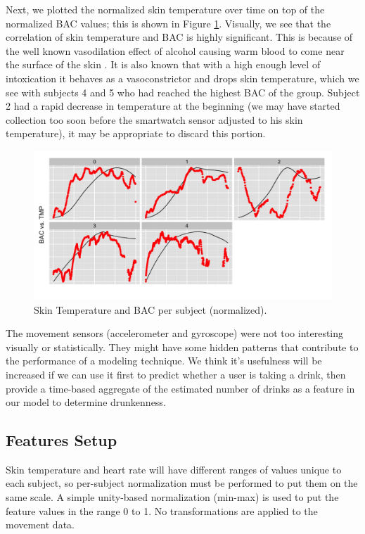 Next, we plotted the normalized skin temperature over time on top of the normalized BAC values; this is shown in Figure \ref{fig:skin_temperatures}. Visually, we see that the correlation of skin temperature and BAC is highly significant. This is because of the well known vasodilation effect of alcohol causing warm blood to come near the surface of the skin \cite{Dekker:1999}. It is also known that with a high enough level of intoxication it behaves as a vasoconstrictor and drops skin temperature, which we see with subjects 4 and 5 who had reached the highest BAC of the group. Subject 2 had a rapid decrease in temperature at the beginning (we may have started collection too soon before the smartwatch sensor adjusted to his skin temperature), it may be appropriate to discard this portion.

\begin{figure}
	\includegraphics[width=1.0\textwidth]{../figs/skin_temperatures}
	\caption{Skin Temperature and BAC per subject (normalized).}
	\label{fig:skin_temperatures}
\end{figure}

The movement sensors (accelerometer and gyroscope) were not too interesting visually or statistically. They might have some hidden patterns that contribute to the performance of a modeling technique. We think it's usefulness will be increased if we can use it first to predict whether a user is taking a drink, then provide a time-based aggregate of the estimated number of drinks as a feature in our model to determine drunkenness.

\subsection{Features Setup}

Skin temperature and heart rate will have different ranges of values unique to each subject, so per-subject normalization must be performed to put them on the same scale. A simple unity-based normalization (min-max) is used to put the feature values in the range 0 to 1. No transformations are applied to the movement data.

